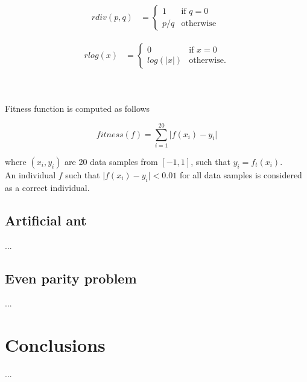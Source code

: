 \documentclass{llncs}
\begin{document}
\noindent\begin{minipage}{.5\linewidth}
\begin{align*}
rdiv(p,q) &= \begin{cases} 1 &\mbox{if } q = 0 \\
p/q & \mbox{otherwise } \end{cases}  
\end{align*}
\end{minipage}%
\begin{minipage}{.5\linewidth}
\begin{align*}
rlog(x) &= \begin{cases} 0 &\mbox{if } x = 0 \\
log(\vert x\vert) & \mbox{otherwise}. \end{cases}
\end{align*}
\end{minipage}

~\\\\
Fitness function is computed as follows

$$ fitness(f) =  \sum\limits_{i=1}^{20}{ \vert f(x_i)-y_i }\vert   $$

where $(x_i,y_i)$ are 20 data samples from $[-1,1]$, such that $y_i = f_t(x_i)$.\\

An individual $f$ such that $\vert f(x_i)-y_i \vert < 0.01 $ for all data samples is 
considered as a correct individual.


\subsection{Artificial ant}
...
\subsection{Even parity problem}
...
\section{Conclusions}
...
\end{document}
